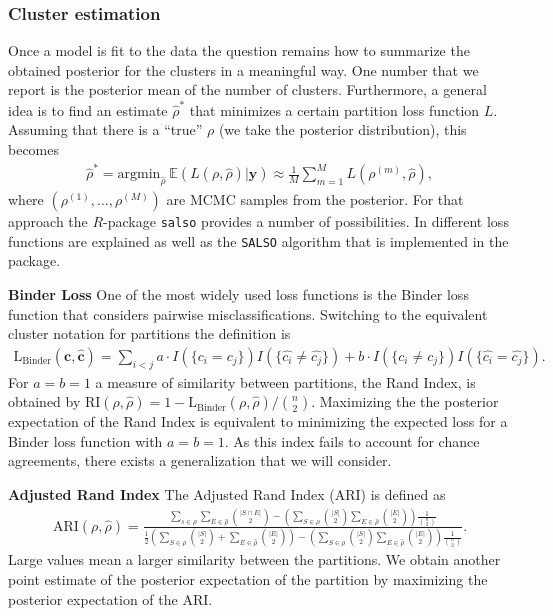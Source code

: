\documentclass[12pt,a4paper]{article}
\begin{document}
\subsubsection{Cluster estimation}
Once a model is fit to the data the question remains how to summarize the obtained posterior for the clusters in a meaningful way. One number that we report is the posterior mean of the number of clusters. Furthermore, a general idea is to find an estimate $\hat{\rho}^*$ that minimizes a certain partition loss function $L$. Assuming that there is a ``true'' $\rho$ (we take the posterior distribution), this becomes
\begin{align*}
    \hat{\rho}^* = \text{argmin}_{\hat{\rho}} \ \mathbb{E} ( L(\rho, \hat{\rho}) | \mathbf{y} ) \approx \frac{1}{M} \sum_{m=1}^M L (\rho^{(m)} , \hat{\rho} ),
\end{align*}
where $\left( \rho^{(1)}, \dots , \rho^{(M)} \right)$ are MCMC samples from the posterior. For that approach the $R$-package \texttt{salso} \cite{salso} provides a number of possibilities. In \cite{Dahl2022-salso} different loss functions are explained as well as the \texttt{SALSO} algorithm that is implemented in the package.

\textbf{Binder Loss} One of the most widely used loss functions is the Binder loss function that considers pairwise misclassifications. Switching to the equivalent cluster notation for partitions the definition is
\begin{align*}
    \text{L}_{\text{Binder}} (\mathbf{c}, \mathbf{\hat{c}} ) = \sum_{i<j} a \cdot  I (\{ c_i = c_j \}) I (\{ \hat{c_i} \neq \hat{c_j} \} ) +  b \cdot I (\{c_i \neq c_j \}) I (\{ \hat{c_i} = \hat{c_j} \}).
\end{align*}
For $a=b=1$ a measure of similarity between partitions, the Rand Index, is obtained by $\text{RI}(\rho, \hat{\rho}) = 1 -  \text{L}_{\text{Binder}}(\rho, \hat{\rho}) / \binom{n}{2}$. Maximizing the the posterior expectation of the Rand Index is equivalent to minimizing the expected loss for a Binder loss function with $a=b=1$. As this index fails to account for chance agreements, there exists a generalization that we will consider.

\textbf{Adjusted Rand Index} The Adjusted Rand Index (ARI) is defined as
\begin{align*}
    \text{ARI} (\rho, \hat{\rho}) = \frac{ \sum_{s \in \rho} \sum_{E \in \hat{\rho}} \binom{| S \cap E |}{2} - \left( \sum_{S \in \rho} \binom{|S|}{2} \sum_{E \in \hat{\rho}} \binom{|E|}{2} \right) \frac{1}{\binom{n}{2}}} {\frac{1}{2} \left( \sum_{S \in \rho} \binom{|S|}{2} + \sum_{E \in \hat{\rho}} \binom{|E|}{2} \right) - \left(\sum_{S \in \rho} \binom{|S|}{2} \sum_{E \in \hat{\rho}} \binom{|E|}{2} \right) \frac{1}{\binom{n}{2}}}.
\end{align*}
Large values mean a larger similarity between the partitions. We obtain another point estimate of the posterior expectation of the partition by maximizing the posterior expectation of the ARI.
\end{document}
